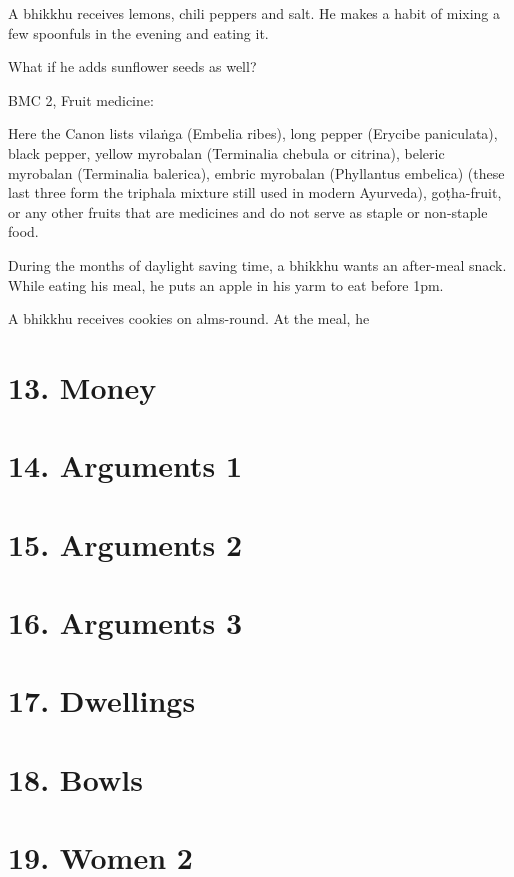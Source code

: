 A bhikkhu receives lemons, chili peppers and salt. He makes a habit of
mixing a few spoonfuls in the evening and eating it.

What if he adds sunflower seeds as well?

BMC 2, Fruit medicine:

Here the Canon lists vilaṅga (Embelia ribes), long pepper (Erycibe
paniculata), black pepper, yellow myrobalan (Terminalia chebula or
citrina), beleric myrobalan (Terminalia balerica), embric myrobalan
(Phyllantus embelica) (these last three form the triphala mixture still
used in modern Ayurveda), goṭha-fruit, or any other fruits that are
medicines and do not serve as staple or non-staple food.

During the months of daylight saving time, a bhikkhu wants an after-meal
snack. While eating his meal, he puts an apple in his yarm to eat before
1pm.

A bhikkhu receives cookies on alms-round. At the meal, he

\section{13. Money}

\section{14. Arguments 1}

\section{15. Arguments 2}

\section{16. Arguments 3}

\section{17. Dwellings}

\section{18. Bowls}

\section{19. Women 2}

